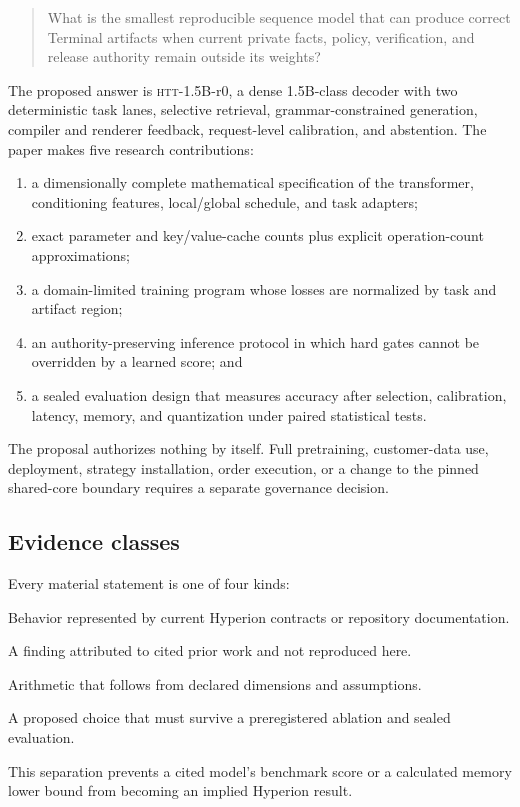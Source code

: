 \documentclass[10pt,letterpaper]{article}
\newcommand{\abbr}[1]{\textsc{\MakeLowercase{#1}}}
\newcommand{\code}[1]{\texttt{\detokenize{#1}}}
\newcommand{\1}{\mathbb{1}}
\begin{document}
\begin{quote}
What is the smallest reproducible sequence model that can produce correct Terminal artifacts when
current private facts, policy, verification, and release authority remain outside its weights?
\end{quote}

The proposed answer is \abbr{HTT}-1.5B-r0, a dense 1.5B-class decoder with two deterministic task
lanes, selective retrieval, grammar-constrained generation, compiler and renderer feedback,
request-level calibration, and abstention.  The paper makes five research contributions:

\begin{enumerate}
  \item a dimensionally complete mathematical specification of the transformer, conditioning
        features, local/global schedule, and task adapters;
  \item exact parameter and key/value-cache counts plus explicit operation-count approximations;
  \item a domain-limited training program whose losses are normalized by task and artifact region;
  \item an authority-preserving inference protocol in which hard gates cannot be overridden by a
        learned score; and
  \item a sealed evaluation design that measures accuracy after selection, calibration, latency,
        memory, and quantization under paired statistical tests.
\end{enumerate}

The proposal authorizes nothing by itself.  Full pretraining, customer-data use, deployment,
strategy installation, order execution, or a change to the pinned \code{public/} shared-core boundary
requires a separate governance decision.

\subsection{Evidence classes}

Every material statement is one of four kinds:
\begin{description}[style=nextline,leftmargin=0pt]
  \item[Implemented boundary.] Behavior represented by current Hyperion contracts or repository
        documentation.
  \item[Source-reported result.] A finding attributed to cited prior work and not reproduced here.
  \item[Derived quantity.] Arithmetic that follows from declared dimensions and assumptions.
  \item[Research hypothesis.] A proposed choice that must survive a preregistered ablation and sealed
        evaluation.
\end{description}
This separation prevents a cited model's benchmark score or a calculated memory lower bound from
becoming an implied Hyperion result.
\end{document}

